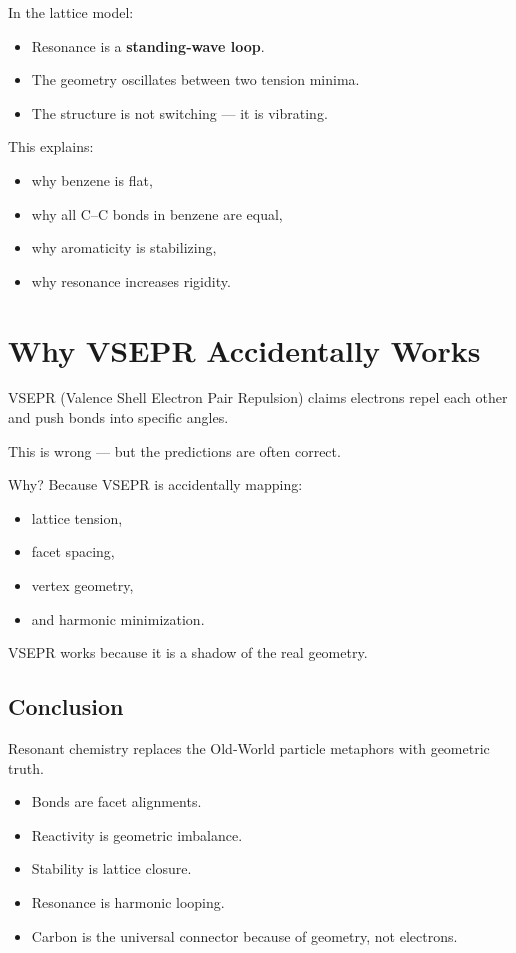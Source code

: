 \documentclass[11pt, letterpaper, openany]{book}
\begin{document}
In the lattice model:

\begin{itemize}
    \item Resonance is a \textbf{standing‑wave loop}.
    \item The geometry oscillates between two tension minima.
    \item The structure is not switching — it is vibrating.
\end{itemize}

This explains:

\begin{itemize}
    \item why benzene is flat,
    \item why all C–C bonds in benzene are equal,
    \item why aromaticity is stabilizing,
    \item why resonance increases rigidity.
\end{itemize}

\section{Why VSEPR Accidentally Works}

VSEPR (Valence Shell Electron Pair Repulsion) claims electrons repel each other and push
bonds into specific angles.

This is wrong — but the predictions are often correct.

Why? Because VSEPR is accidentally mapping:

\begin{itemize}
    \item lattice tension,
    \item facet spacing,
    \item vertex geometry,
    \item and harmonic minimization.
\end{itemize}

VSEPR works because it is a shadow of the real geometry.

\subsection*{Conclusion}

Resonant chemistry replaces the Old‑World particle metaphors with geometric truth.

\begin{itemize}
    \item Bonds are facet alignments.
    \item Reactivity is geometric imbalance.
    \item Stability is lattice closure.
    \item Resonance is harmonic looping.
    \item Carbon is the universal connector because of geometry, not electrons.
\end{itemize}
\end{document}
